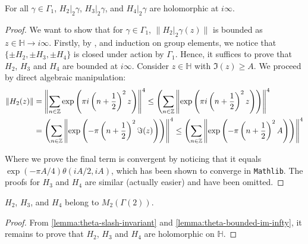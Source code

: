 \begin{lemma}\label{lemma:theta-bounded-im-infty}\leanok
  For all $\gamma \in \Gamma_1$, $H_{2}|_2 \gamma$, $H_{3}|_2 \gamma$, and $H_{4}|_2 \gamma$ are holomorphic at $i\infty$.
\end{lemma}
\begin{proof}
    \leanok
    We want to show that for $\gamma \in \Gamma_1$, $\|H_2|_2\gamma(z)\|$ is bounded as $z \in \mathbb{H} \to i\infty$. Firstly, by ,  and induction on group elements, we notice that $\{\pm H_2, \pm H_3, \pm H_4\}$ is closed under action by $\Gamma_1$. Hence, it suffices to prove that $H_2$, $H_3$ and $H_4$ are bounded at $i\infty$. Consider $z \in \mathbb{H}$ with $\Im(z) \geq A$. We proceed by direct algebraic manipulation:
    \begin{align}
        \|H_2(z)\|
        &= \left\|\sum_{n \in \mathbb{Z}} \exp\left(\pi i \left(n + \frac{1}{2}\right)^2 z\right)\right\|^4
        \leq \left(\sum_{n \in \mathbb{Z}} \left\|\exp\left(\pi i \left(n + \frac{1}{2}\right)^2 z\right)\right)\right\|^4 \\
        &= \left(\sum_{n \in \mathbb{Z}} \left\|\exp\left(-\pi \left(n + \frac{1}{2}\right)^2 \Im(z)\right)\right)\right\|^4
        \leq \left(\sum_{n \in \mathbb{Z}} \left\|\exp\left(-\pi \left(n + \frac{1}{2}\right)^2 A\right)\right)\right\|^4
    \end{align}

    Where we prove the final term is convergent by noticing that it equals $\exp(-\pi A / 4)\theta(iA / 2, iA)$, which has been shown to converge in \texttt{Mathlib}. The proofs for $H_3$ and $H_4$ are similar (actually easier) and have been omitted.

\end{proof}

\begin{lemma}\label{lemma:theta-modular}\leanok
$H_{2}$, $H_{3}$, and $H_{4}$ belong to $M_2(\Gamma(2))$.
\end{lemma}
\begin{proof}
    \leanok
    From \cref{lemma:theta-slash-invariant} and \cref{lemma:theta-bounded-im-infty}, it remains to prove that $H_2$, $H_3$ and $H_4$ are holomorphic on $\mathbb{H}$. 
\end{proof}


